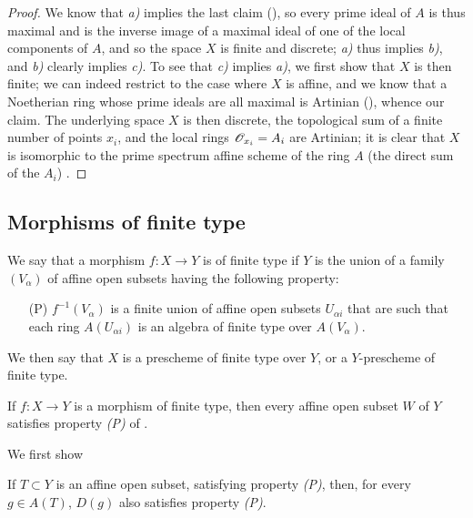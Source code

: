 \begin{proof}
\label{proof-1.6.2.2}
We know that \emph{a)} implies the last claim (\cite[p.~205, th.~3]{I-13}), so every prime ideal of $A$ is thus maximal and is the inverse image of a maximal ideal of one of the local components of $A$, and so the space $X$ is finite and discrete;
\emph{a)} thus implies \emph{b)}, and \emph{b)} clearly implies \emph{c)}.
To see that \emph{c)} implies \emph{a)}, we first show that $X$ is then finite;
we can indeed restrict to the case where $X$ is affine, and we know that a Noetherian ring whose prime ideals are all maximal is Artinian (\cite[p.~203]{I-13}), whence our claim.
The underlying space $X$ is then discrete, the topological sum of a finite number of points $x_i$, and the local rings $\mathscr{O}_{x_i}=A_i$ are Artinian;
it is clear that $X$ is isomorphic to the prime spectrum affine scheme of the ring $A$ (the direct sum of the $A_i$) .
\end{proof}

\subsection{Morphisms of finite type}
\label{subsection-morphisms-of-finite-type}

\begin{defn}[6.3.1]
\label{1.6.3.1}
We say that a morphism $f\colon X\to Y$ is of finite type if $Y$ is the union of a family $(V_\alpha)$ of affine open subsets having the following property:
\begin{itemize}
    \item[(P)] $f^{-1}(V_\alpha)$ is a finite union of affine open subsets $U_{\alpha i}$ that are such that each ring $A(U_{\alpha i})$ is an algebra of finite type over $A(V_\alpha)$.
\end{itemize}
We then say that $X$ is a prescheme of finite type over $Y$, or a $Y$-prescheme of finite type.
\end{defn}

\begin{prop}[6.3.2]
\label{1.6.3.2}
If $f\colon X\to Y$ is a morphism of finite type, then every affine open subset $W$ of $Y$ satisfies property \emph{(P)} of .
\end{prop}

We first show
\begin{lem}[6.3.2.1]
\label{1.6.3.2.1}
If $T\subset Y$ is an affine open subset, satisfying property \emph{(P)}, then, for every $g\in A(T)$, $D(g)$ also satisfies property \emph{(P)}.
\end{lem}


